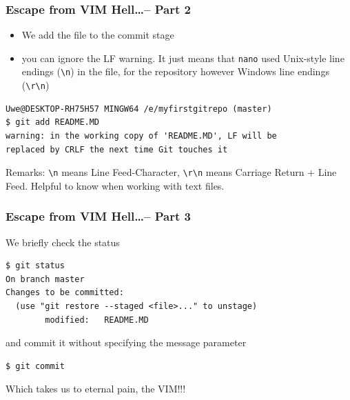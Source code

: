 \documentclass[12pt,english]{beamer}
\begin{document}
\begin{frame}[containsverbatim]
\frametitle{Escape from VIM Hell\ldots -- Part 2} 

\begin{itemize}
\item We add the file to the commit stage
\item you can ignore the LF warning. It just means that \texttt{nano} used Unix-style line endings (\texttt{\textbackslash n}) in the file, for the repository however Windows line endings (\texttt{\textbackslash r\textbackslash n})
\end{itemize}

\begin{lstlisting}[basicstyle=\ttfamily\scriptsize]
Uwe@DESKTOP-RH75H57 MINGW64 /e/myfirstgitrepo (master)
$ git add README.MD
warning: in the working copy of 'README.MD', LF will be 
replaced by CRLF the next time Git touches it
\end{lstlisting}

Remarks: \texttt{\textbackslash n} means Line Feed-Character,  \texttt{\textbackslash r\textbackslash n} means Carriage Return + Line Feed. Helpful to know when working with text files.


\end{frame}



\begin{frame}[containsverbatim]
\frametitle{Escape from VIM Hell\ldots -- Part 3} 

We briefly check the status

\begin{lstlisting}[basicstyle=\ttfamily\scriptsize]
$ git status
On branch master
Changes to be committed:
  (use "git restore --staged <file>..." to unstage)
        modified:   README.MD
\end{lstlisting}

and commit it without specifying the message parameter

\begin{lstlisting}[basicstyle=\ttfamily\scriptsize]
$ git commit
\end{lstlisting}

Which takes us to eternal pain, the VIM!!!


\end{frame}
\end{document}
